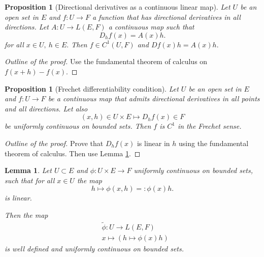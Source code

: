 \documentclass{article}
\newtheorem{prop}[theorem]{Proposition}
\newtheorem{lemma}[theorem]{Lemma}
\begin{document}
\begin{prop}[Directional derivatives as a continuous linear map]
    Let $U$ be an open set in $E$ and $f:U \rightarrow F$ a function that has directional derivatives in all directions. Let $A: U \rightarrow L(E,F)$ a continuous map such that
    \begin{equation}
        D_h f(x) = A(x) h.
    \end{equation}
    for all $x \in U,\ h \in E.$
    Then $f \in C^1(U,F)$ and $Df(x) h = A(x) h.$
\end{prop}
\begin{proof}[Outline of the proof]
    Use the fundamental theorem of calculus on $f(x + h) - f(x).$
\end{proof}

\begin{prop}[Frechet differentiability condition]\label{theo:FrechetDirectional}
    Let $U$ be an open set in $E$ and $f: U \rightarrow F$ be a continuous map that admits directional derivatives in all points and all directions. Let also
    \begin{equation}
        (x,h) \in U \times E \mapsto D_h f(x) \in F
    \end{equation}
    be uniformly continuous on bounded sets. Then $f$ is $C^1$ in the Frechet sense.
\end{prop}
\begin{proof}[Outline of the proof]
    Prove that $D_h f(x)$ is linear in $h$ using the fundamental theorem of calculus.
    Then use Lemma \ref{lem:Frechet}.
\end{proof}

\begin{lemma}\label{lem:Frechet}
    Let $U \subset E$ and $\phi: U \times E \rightarrow F$ uniformly continuous on bounded sets, such that for all $x \in U$ the map
    \begin{equation}
        h  \mapsto \phi(x,h) =: \phi(x) h.  
    \end{equation}
    is linear.

    Then the map
    \begin{align}
        &\tilde{\phi}: U \rightarrow L(E,F) \\
        &x \mapsto (h \mapsto \phi(x) h)
    \end{align}
    is well defined and uniformly continuous on bounded sets.
\end{lemma}
\end{document}

